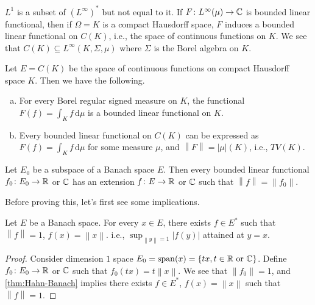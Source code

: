 \begin{remark}
	\(L^1\) is a subset of \((L^{\infty})^{\ast}\) but not equal to it. If \(F\colon L^{\infty} (\mu )\to \mathbb{\MakeUppercase{c}} \) is bounded linear functional, then if \(\Omega = K\) is a compact Hausdorff space, \(F\) induces a bounded linear functional on \(C(K)\), i.e., the space of continuous functions on \(K\). We see that \(C(K)\subseteq L^{\infty} (K, \Sigma , \mu )\) where \(\Sigma \) is the Borel algebra on \(K\).
\end{remark}

\begin{theorem}
	Let \(E = C(K)\) be the space of continuous functions on compact Hausdorff space \(K\). Then we have the following.
	\begin{enumerate}[(a)]
		\item For every Borel regular signed measure on \(K\), the functional \(F(f) = \int _K f\,\mathrm{d} \mu \) is a bounded linear functional on \(K\).
		\item Every bounded linear functional on \(C(K)\) can be expressed as \(F(f) = \int _K f\,\mathrm{d} \mu \)  for some measure \(\mu \), and \(\left\lVert F\right\rVert = \left\vert \mu  \right\vert (K) \), i.e., \(TV(K)\).
	\end{enumerate}
\end{theorem}


\begin{theorem}\label{thm:Hahn-Banach}
	Let \(E_0\) be a subspace of a Banach space \(E\). Then every bounded linear functional \(f_0 \colon E_0 \to \mathbb{\MakeUppercase{r}} \) or \(\mathbb{\MakeUppercase{c}} \) has an extension \(f\colon E\to \mathbb{\MakeUppercase{r}} \) or \(\mathbb{\MakeUppercase{c}} \) such that \(\left\lVert f\right\rVert = \left\lVert f_0\right\rVert.\)
\end{theorem}

Before proving this, let's first see some implications.

\begin{proposition}\label{thm:supporting-hyperplane-theorem}
	Let \(E\) be a Banach space. For every \(x\in E\), there exists \(f\in E^{\ast} \)  such that \(\left\lVert f\right\rVert = 1\), \(f(x) = \left\lVert x\right\rVert \). i.e., \(\sup _{\left\lVert y\right\rVert = 1} \left\vert f(y) \right\vert \) attained at \(y = x\).
\end{proposition}
\begin{proof}
	Consider dimension \(1\) space \(E_0 = \mathop{\mathrm{span}}(x) = \left\{ tx,t\in \mathbb{\MakeUppercase{r}} \text{ or }\mathbb{\MakeUppercase{c}}   \right\} \). Define \(f_0\colon E_0 \to \mathbb{\MakeUppercase{r}} \) or \(\mathbb{\MakeUppercase{c}} \) such that \(f_0(tx) = t \left\lVert x\right\rVert \). We see that \(\left\lVert f_0\right\rVert = 1\), and \autoref{thm:Hahn-Banach} implies there exists \(f\in E^{\ast} \), \(f(x) = \left\lVert x\right\rVert \) such that \(\left\lVert f\right\rVert =1\).
\end{proof}

